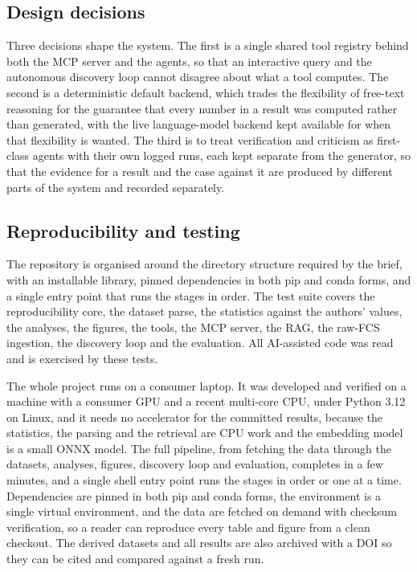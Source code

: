 \documentclass[11pt]{article}
\begin{document}
\subsection{Design decisions}
Three decisions shape the system. The first is a single shared tool registry behind both the MCP
server and the agents, so that an interactive query and the autonomous discovery loop cannot
disagree about what a tool computes. The second is a deterministic default backend, which trades the
flexibility of free-text reasoning for the guarantee that every number in a result was computed
rather than generated, with the live language-model backend kept available for when that flexibility
is wanted. The third is to treat verification and criticism as first-class agents with their own
logged runs, each kept separate from the generator, so that the evidence for a result and
the case against it are produced by different parts of the system and recorded separately.

\subsection{Reproducibility and testing}
The repository is organised around the directory structure required by the brief, with an
installable library, pinned dependencies in both pip and conda forms, and a single entry point that
runs the stages in order. The test suite covers the reproducibility core, the dataset parse, the
statistics against the authors' values, the analyses, the figures, the tools, the MCP server, the
RAG, the raw-FCS ingestion, the discovery loop and the evaluation. All AI-assisted code was read and
is exercised by these tests.

The whole project runs on a consumer laptop. It was developed and verified on a machine with a
consumer GPU and a recent multi-core CPU, under Python 3.12 on Linux, and it needs no accelerator for
the committed results, because the statistics, the parsing and the retrieval are CPU work and the
embedding model is a small ONNX model. The full pipeline, from fetching the data through the datasets,
analyses, figures, discovery loop and evaluation, completes in a few minutes, and a single shell entry
point runs the stages in order or one at a time. Dependencies are pinned in both pip and conda forms,
the environment is a single virtual environment, and the data are fetched on demand with checksum
verification, so a reader can reproduce every table and figure from a clean checkout. The derived
datasets and all results are also archived with a DOI so they can be cited and compared against a
fresh run.
\end{document}
